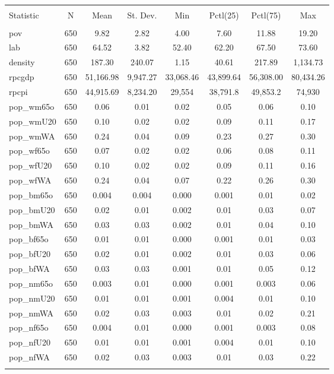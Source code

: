 
\begin{table}[!htbp] \centering 
  \caption{} 
  \label{} 
\begin{tabular}{@{\extracolsep{5pt}}lccccccc} 
\\[-1.8ex]\hline 
\hline \\[-1.8ex] 
Statistic & \multicolumn{1}{c}{N} & \multicolumn{1}{c}{Mean} & \multicolumn{1}{c}{St. Dev.} & \multicolumn{1}{c}{Min} & \multicolumn{1}{c}{Pctl(25)} & \multicolumn{1}{c}{Pctl(75)} & \multicolumn{1}{c}{Max} \\ 
\hline \\[-1.8ex] 
pov & 650 & 9.82 & 2.82 & 4.00 & 7.60 & 11.88 & 19.20 \\ 
lab & 650 & 64.52 & 3.82 & 52.40 & 62.20 & 67.50 & 73.60 \\ 
density & 650 & 187.30 & 240.07 & 1.15 & 40.61 & 217.89 & 1,134.73 \\ 
rpcgdp & 650 & 51,166.98 & 9,947.27 & 33,068.46 & 43,899.64 & 56,308.00 & 80,434.26 \\ 
rpcpi & 650 & 44,915.69 & 8,234.20 & 29,554 & 38,791.8 & 49,853.2 & 74,930 \\ 
pop\_wm65o & 650 & 0.06 & 0.01 & 0.02 & 0.05 & 0.06 & 0.10 \\ 
pop\_wmU20 & 650 & 0.10 & 0.02 & 0.02 & 0.09 & 0.11 & 0.17 \\ 
pop\_wmWA & 650 & 0.24 & 0.04 & 0.09 & 0.23 & 0.27 & 0.30 \\ 
pop\_wf65o & 650 & 0.07 & 0.02 & 0.02 & 0.06 & 0.08 & 0.11 \\ 
pop\_wfU20 & 650 & 0.10 & 0.02 & 0.02 & 0.09 & 0.11 & 0.16 \\ 
pop\_wfWA & 650 & 0.24 & 0.04 & 0.07 & 0.22 & 0.26 & 0.30 \\ 
pop\_bm65o & 650 & 0.004 & 0.004 & 0.000 & 0.001 & 0.01 & 0.02 \\ 
pop\_bmU20 & 650 & 0.02 & 0.01 & 0.002 & 0.01 & 0.03 & 0.07 \\ 
pop\_bmWA & 650 & 0.03 & 0.03 & 0.002 & 0.01 & 0.04 & 0.10 \\ 
pop\_bf65o & 650 & 0.01 & 0.01 & 0.000 & 0.001 & 0.01 & 0.03 \\ 
pop\_bfU20 & 650 & 0.02 & 0.01 & 0.002 & 0.01 & 0.03 & 0.06 \\ 
pop\_bfWA & 650 & 0.03 & 0.03 & 0.001 & 0.01 & 0.05 & 0.12 \\ 
pop\_nm65o & 650 & 0.003 & 0.01 & 0.000 & 0.001 & 0.003 & 0.06 \\ 
pop\_nmU20 & 650 & 0.01 & 0.01 & 0.001 & 0.004 & 0.01 & 0.10 \\ 
pop\_nmWA & 650 & 0.02 & 0.03 & 0.003 & 0.01 & 0.02 & 0.21 \\ 
pop\_nf65o & 650 & 0.004 & 0.01 & 0.000 & 0.001 & 0.003 & 0.08 \\ 
pop\_nfU20 & 650 & 0.01 & 0.01 & 0.001 & 0.004 & 0.01 & 0.10 \\ 
pop\_nfWA & 650 & 0.02 & 0.03 & 0.003 & 0.01 & 0.03 & 0.22 \\ 
\hline \\[-1.8ex] 
\end{tabular} 
\end{table} 
